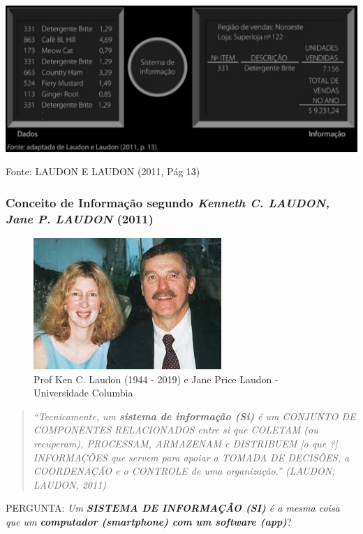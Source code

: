 \documentclass[
]{book}
\begin{document}
\includegraphics{images/1-dados-info/Dados-Info.jpg}

Fonte: LAUDON E LAUDON (2011, Pág 13)

\subsubsection{\texorpdfstring{Conceito de Informação segundo \emph{Kenneth C. LAUDON, Jane P. LAUDON} (2011)}{Conceito de Informação segundo Kenneth C. LAUDON, Jane P. LAUDON (2011)}}\label{conceito-de-informauxe7uxe3o-segundo-kenneth-c.-laudon-jane-p.-laudon-2011}

\begin{figure}
\centering
\includegraphics{images/Ken_Jane.jpg}
\caption{Prof Ken C. Laudon (1944 - 2019) e Jane Price Laudon - Universidade Columbia}
\end{figure}

\begin{quote}
\emph{``Tecnicamente, um \textbf{sistema de informação (Si)} é um CONJUNTO DE COMPONENTES RELACIONADOS entre si que COLETAM (ou recuperam), PROCESSAM, ARMAZENAM c DISTRIBUEM {[}o que ?{]} INFORMAÇÕES que servem para apoiar a TOMADA DE DECISÕES, a COORDENAÇÃO e o CONTROLE de uma organização.'' (LAUDON; LAUDON, 2011)}
\end{quote}

PERGUNTA: \emph{Um \textbf{SISTEMA DE INFORMAÇÃO (SI)} é a mesma coisa que um \textbf{computador (smartphone) com um software (app)}}?
\end{document}
